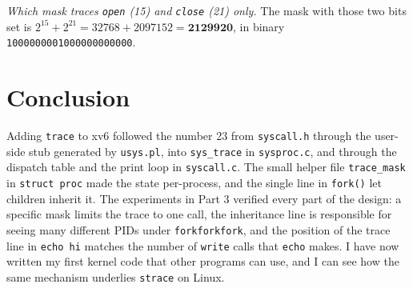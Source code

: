 \documentclass[12pt,a4paper]{article}
\begin{document}
\emph{Which mask traces \texttt{open} (15) and \texttt{close} (21) only.} The mask with those two bits set is $2^{15} + 2^{21} = 32768 + 2097152 = \mathbf{2129920}$, in binary \texttt{1000000001000000000000}.

\section*{Conclusion}

Adding \texttt{trace} to xv6 followed the number 23 from \texttt{syscall.h} through the user-side stub generated by \texttt{usys.pl}, into \texttt{sys\_trace} in \texttt{sysproc.c}, and through the dispatch table and the print loop in \texttt{syscall.c}. The small helper file \texttt{trace\_mask} in \texttt{struct proc} made the state per-process, and the single line in \texttt{fork()} let children inherit it. The experiments in Part 3 verified every part of the design: a specific mask limits the trace to one call, the inheritance line is responsible for seeing many different PIDs under \texttt{forkforkfork}, and the position of the trace line in \texttt{echo hi} matches the number of \texttt{write} calls that \texttt{echo} makes. I have now written my first kernel code that other programs can use, and I can see how the same mechanism underlies \texttt{strace} on Linux.
\end{document}
